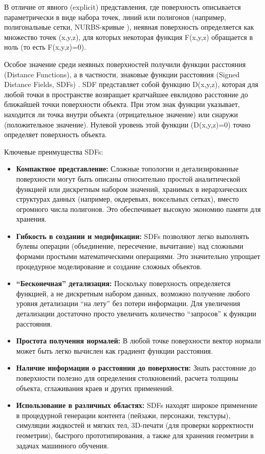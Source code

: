 В отличие от явного (explicit) представления, где поверхность описывается параметрически в виде набора точек, линий или полигонов (например, полигональные сетки, NURBS-кривые \cite{piegl2012nurbs}), неявная поверхность определяется как множество точек (x,y,z), для которых некоторая функция F(x,y,z) обращается в ноль (то есть F(x,y,z)=0).

Особое значение среди неявных поверхностей получили функции расстояния (Distance Functions), а в частности, знаковые функции расстояния (Signed Distance Fields, SDFs) \cite{Osher2003}. SDF представляет собой функцию D(x,y,z), которая для любой точки в пространстве возвращает кратчайшее евклидово расстояние до ближайшей точки поверхности объекта. При этом знак функции указывает, находится ли точка внутри объекта (отрицательное значение) или снаружи (положительное значение). Нулевой уровень этой функции (D(x,y,z)=0) точно определяет поверхность объекта.

Ключевые преимущества SDFs:

\begin{itemize}
    \item
    \textbf{Компактное представление:} Сложные топологии и детализированные поверхности могут быть описаны относительно простой аналитической функцией или дискретным набором значений, хранимых в иерархических структурах данных (например, окдеревьях, воксельных сетках), вместо огромного числа полигонов. Это обеспечивает высокую экономию памяти для хранения.
    \item
    \textbf{Гибкость в создании и модификации:} SDFs позволяют легко выполнять булевы операции (объединение, пересечение, вычитание) над сложными формами простыми математическими операциями. Это значительно упрощает процедурное моделирование и создание сложных объектов.
    \item
    \textbf{``Бесконечная'' детализация:} Поскольку поверхность определяется функцией, а не дискретным набором данных, возможно получение любого уровня детализации ``на лету'' без потери информации. Для увеличения детализации достаточно просто увеличить количество ``запросов'' к функции расстояния.
    \item
    \textbf{Простота получения нормалей:} В любой точке поверхности вектор нормали может быть легко вычислен как градиент функции расстояния.
    \item
    \textbf{Наличие информации о расстоянии до поверхности:} Знать расстояние до поверхности полезно для определения столкновений, расчета толщины объекта, сглаживания краев и других применений.
    \item
    \textbf{Использование в различных областях:} SDFs находят широкое применение в процедурной генерации контента (пейзажи, персонажи, текстуры), симуляции жидкостей и мягких тел, 3D-печати (для проверки корректности геометрии), быстрого прототипирования, а также для хранения геометрии в задачах машинного обучения.
\end{itemize}

